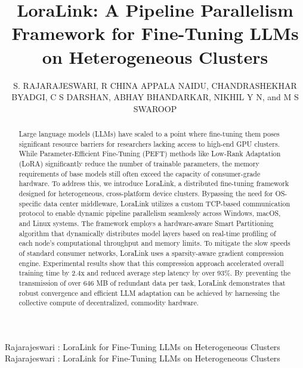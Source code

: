 \documentclass{ieeeaccess}
\begin{document}

\title{LoraLink: A Pipeline Parallelism Framework for Fine-Tuning LLMs on Heterogeneous Clusters}
\author{\uppercase{S. Rajarajeswari},
\uppercase{R China Appala Naidu},
\uppercase{Chandrashekhar Byadgi},
\uppercase{C S Darshan},
\uppercase{Abhay Bhandarkar},
\uppercase{Nikhil Y N},
and \uppercase{M S Swaroop}}

\address[1]{Department of Computer Science and Engineering, Ramaiah Institute of Technology, Bengaluru, India}
\address[2]{Samsung R\&D Institute Bengaluru, Bengaluru, India}

\markboth
{Rajarajeswari \headeretal: LoraLink for Fine-Tuning LLMs on Heterogeneous Clusters}
{Rajarajeswari \headeretal: LoraLink for Fine-Tuning LLMs on Heterogeneous Clusters}


\begin{abstract}
Large language models (LLMs) have scaled to a point where fine-tuning them poses significant resource barriers for researchers lacking access to high-end GPU clusters. While Parameter-Efficient Fine-Tuning (PEFT) methods like Low-Rank Adaptation (LoRA) significantly reduce the number of trainable parameters, the memory requirements of base models still often exceed the capacity of consumer-grade hardware. To address this, we introduce LoraLink, a distributed fine-tuning framework designed for heterogeneous, cross-platform device clusters. Bypassing the need for OS-specific data center middleware, LoraLink utilizes a custom TCP-based communication protocol to enable dynamic pipeline parallelism seamlessly across Windows, macOS, and Linux systems. The framework employs a hardware-aware Smart Partitioning algorithm that dynamically distributes model layers based on real-time profiling of each node's computational throughput and memory limits. To mitigate the slow speeds of standard consumer networks, LoraLink uses a sparsity-aware gradient compression engine. Experimental results show that this compression approach accelerated overall training time by 2.4x and reduced average step latency by over 93\%. By preventing the transmission of over 646 MB of redundant data per task, LoraLink demonstrates that robust convergence and efficient LLM adaptation can be achieved by harnessing the collective compute of decentralized, commodity hardware.
\end{abstract}
\end{document}
